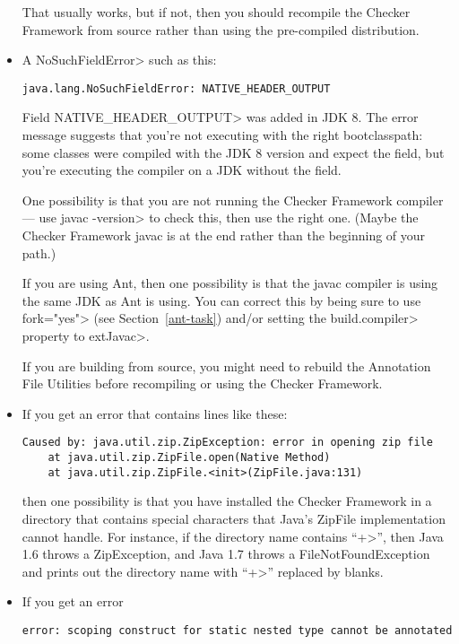 \begin{itemize}
That usually works, but if not, then you should recompile the Checker
Framework from source rather than using the pre-compiled distribution.


\item
A \<NoSuchFieldError> such as this:

\begin{Verbatim}
java.lang.NoSuchFieldError: NATIVE_HEADER_OUTPUT
\end{Verbatim}

\noindent
Field \<NATIVE\_HEADER\_OUTPUT> was added in JDK 8.
The error message suggests that
you're not executing with the right bootclasspath: some classes were
compiled with the JDK 8 version and expect the field, but you're
executing the compiler on a JDK without the field.

One possibility is that you are not running the Checker Framework compiler
--- use \<javac -version> to check this, then use the right one.  (Maybe
the Checker Framework javac is at the end rather than the beginning of your
path.)

If you are using Ant, then one possibility
is that the javac compiler is using the same JDK as Ant is using.  You can
correct this by being sure to use \<fork="yes"> (see
Section~\ref{ant-task}) and/or setting the \<build.compiler> property to
\<extJavac>.

If you are building from source, you might need to rebuild the Annotation
File Utilities before recompiling or using the Checker Framework.


\item
If you get an error that contains lines like these:

\begin{Verbatim}
Caused by: java.util.zip.ZipException: error in opening zip file
	at java.util.zip.ZipFile.open(Native Method)
	at java.util.zip.ZipFile.<init>(ZipFile.java:131)
\end{Verbatim}

\noindent
then one possibility is that you have installed the Checker Framework in a
directory that contains special characters that Java's ZipFile
implementation cannot handle.  For instance, if the directory name contains
``\<+>'', then Java 1.6 throws a ZipException, and Java 1.7 throws a
FileNotFoundException and prints out the directory name with ``\<+>''
replaced by blanks.

\item
If you get an error

\begin{Verbatim}
error: scoping construct for static nested type cannot be annotated
\end{Verbatim}


\end{itemize}
